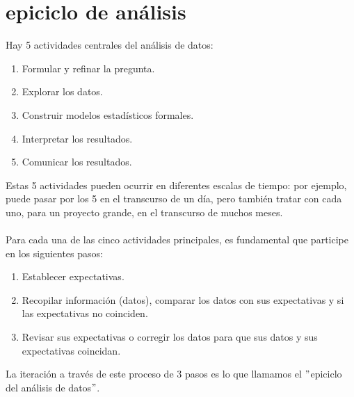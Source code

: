 \documentclass[10pt]{book}
\begin{document}
\section{epiciclo de análisis}
Hay 5 actividades centrales del análisis de datos:
\begin{enumerate}[\bfseries 1.]
\item Formular y refinar la pregunta.
\item Explorar los datos.
\item Construir modelos estadísticos formales.
\item Interpretar los resultados.
\item Comunicar los resultados.
\end{enumerate} 
Estas 5 actividades pueden ocurrir en diferentes escalas de tiempo: por ejemplo, puede pasar por los 5 en el transcurso de un día, pero también tratar con cada uno, para un proyecto grande, en el transcurso de muchos meses.\\\\
Para cada una de las cinco actividades principales, es fundamental que participe en los siguientes pasos:
\begin{enumerate}[\bfseries a)]
\item Establecer expectativas.
\item Recopilar información (datos), comparar los datos con sus expectativas y si las expectativas no coinciden.
\item Revisar sus expectativas o corregir los datos para que sus datos y sus expectativas coincidan. 
\end{enumerate}
La iteración a través de este proceso de 3 pasos es lo que llamamos el $"$epiciclo del análisis de datos$"$.\\
\end{document}
